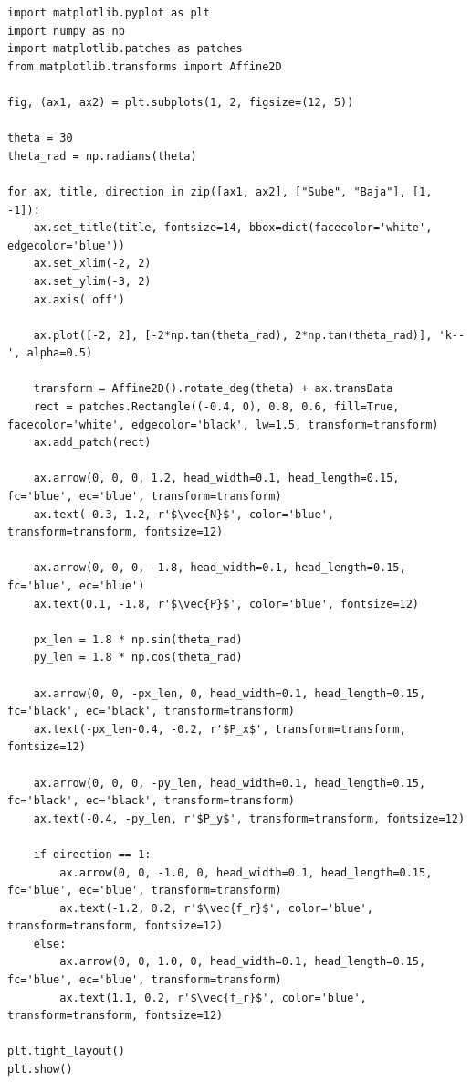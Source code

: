 \documentclass[12pt, a4paper]{article}
\begin{document}
\begin{lstlisting}
import matplotlib.pyplot as plt
import numpy as np
import matplotlib.patches as patches
from matplotlib.transforms import Affine2D

fig, (ax1, ax2) = plt.subplots(1, 2, figsize=(12, 5))

theta = 30
theta_rad = np.radians(theta)

for ax, title, direction in zip([ax1, ax2], ["Sube", "Baja"], [1, -1]):
    ax.set_title(title, fontsize=14, bbox=dict(facecolor='white', edgecolor='blue'))
    ax.set_xlim(-2, 2)
    ax.set_ylim(-3, 2)
    ax.axis('off')
    
    ax.plot([-2, 2], [-2*np.tan(theta_rad), 2*np.tan(theta_rad)], 'k--', alpha=0.5)
    
    transform = Affine2D().rotate_deg(theta) + ax.transData
    rect = patches.Rectangle((-0.4, 0), 0.8, 0.6, fill=True, facecolor='white', edgecolor='black', lw=1.5, transform=transform)
    ax.add_patch(rect)
    
    ax.arrow(0, 0, 0, 1.2, head_width=0.1, head_length=0.15, fc='blue', ec='blue', transform=transform)
    ax.text(-0.3, 1.2, r'$\vec{N}$', color='blue', transform=transform, fontsize=12)
    
    ax.arrow(0, 0, 0, -1.8, head_width=0.1, head_length=0.15, fc='blue', ec='blue')
    ax.text(0.1, -1.8, r'$\vec{P}$', color='blue', fontsize=12)
    
    px_len = 1.8 * np.sin(theta_rad)
    py_len = 1.8 * np.cos(theta_rad)
    
    ax.arrow(0, 0, -px_len, 0, head_width=0.1, head_length=0.15, fc='black', ec='black', transform=transform)
    ax.text(-px_len-0.4, -0.2, r'$P_x$', transform=transform, fontsize=12)
    
    ax.arrow(0, 0, 0, -py_len, head_width=0.1, head_length=0.15, fc='black', ec='black', transform=transform)
    ax.text(-0.4, -py_len, r'$P_y$', transform=transform, fontsize=12)
    
    if direction == 1:
        ax.arrow(0, 0, -1.0, 0, head_width=0.1, head_length=0.15, fc='blue', ec='blue', transform=transform)
        ax.text(-1.2, 0.2, r'$\vec{f_r}$', color='blue', transform=transform, fontsize=12)
    else:
        ax.arrow(0, 0, 1.0, 0, head_width=0.1, head_length=0.15, fc='blue', ec='blue', transform=transform)
        ax.text(1.1, 0.2, r'$\vec{f_r}$', color='blue', transform=transform, fontsize=12)

plt.tight_layout()
plt.show()
\end{lstlisting}
\end{document}
